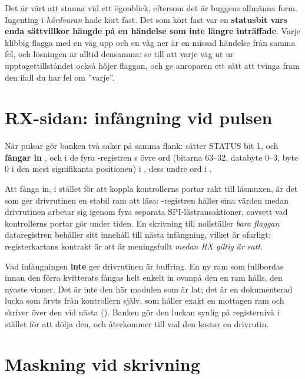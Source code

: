 Det är värt att stanna vid ett ögonblick, eftersom det är buggens allmänna form. Ingenting i
\emph{hårdvaran} hade kört fast. Det som kört fast var en \textbf{statusbit vars enda sättvillkor
hängde på en händelse som inte längre inträffade}. Varje klibbig flagga med en väg upp och en väg ner
är en missad händelse från samma fel, och lösningen är alltid densamma: se till att varje väg ut ur
upptagettillståndet också höjer flaggan, och ge anroparen ett sätt att tvinga fram den ifall du har
fel om ”varje”.

\section{RX-sidan: infångning vid pulsen}
\label{c18:sec:rx}

När  pulsar gör banken två saker på samma flank: sätter STATUS bit 1, och
\textbf{fångar in} ,  och  i de fyra -registren
\textemdash{} s övre ord (bitarna 63--32, databyte 0--3, byte 0 i den mest signifikanta
positionen) i , dess undre ord i .

Att fånga in, i stället för att koppla kontrollerns portar rakt till läsmuxen, är det som ger
drivrutinen en stabil ram att läsa: -registren håller sina värden medan drivrutinen
arbetar sig igenom fyra separata SPI-lästransaktioner, oavsett vad kontrollerns portar gör under
tiden. En skrivning till  nollställer \emph{bara flaggan} \textemdash{} dataregistren
behåller sitt innehåll till nästa infångning, vilket är ofarligt: registerkartans kontrakt är att
 är meningsfullt \emph{medan RX giltig är satt}.

Vad infångningen \textbf{inte} ger drivrutinen är buffring. En ny ram som fullbordas innan den förra
kvitterats fångas helt enkelt in ovanpå den \textemdash{} en ram hålls, den nyaste vinner. Det är
inte den här modulen som är lat; det är en dokumenterad lucka som ärvts från kontrollern själv, som
håller exakt en mottagen ram och skriver över den vid nästa (). Banken gör den luckan
synlig på registernivå i stället för att dölja den, och  återkommer till vad den
kostar en drivrutin.

\section{Maskning vid skrivning}
\label{c18:sec:mask}

